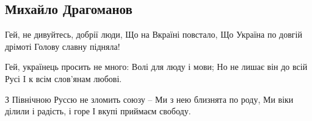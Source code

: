  
 
 

\subsection{Михайло Драгоманов}

Гей, не дивуйтесь, добрії люди,
Що на Вкраїні повстало,
Що Україна по довгій дрімоті
Голову славну підняла!

Гей, українець просить не много:
Волі для люду і мови;
Но не лишає він до всій Русі
I к всім слов'янам любові.

З Північною Руссю не зломить союзу – 
Ми з нею близнята по роду, 
Ми віки ділили і радість, і горе 
І вкупі приймаєм свободу.

